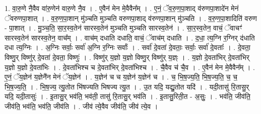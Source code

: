 \documentclass[17pt]{extarticle}
\begin{document}
1. वा॒रु॒णे नै॒वैव वा॑रु॒णेन॑ वारु॒णे नै॒व । . ए॒वैन॑ मेन मे॒वैवैन᳚म् । . ए॒नं॒ ॅव॒रु॒ण॒पा॒शाद् व॑रुणपा॒शादे॑न मेनं ॅवरुणपा॒शात् । . व॒रु॒ण॒पा॒शान् मु॑ञ्चति मुञ्चति वरुणपा॒शाद् व॑रुणपा॒शान् मु॑ञ्चति । . व॒रु॒ण॒पा॒शादिति॑ वरुण - पा॒शात् । . मु॒ञ्च॒ति॒ सा॒र॒स्व॒तेन॑ सारस्व॒तेन॑ मुञ्चति मुञ्चति सारस्व॒तेन॑ । . सा॒र॒स्व॒तेन॒ वाचं॒ ॅवाचꣳ॑ सारस्व॒तेन॑ सारस्व॒तेन॒ वाच᳚म् । . वाच॑म् दधाति दधाति॒ वाचं॒ ॅवाच॑म् दधाति । . द॒धा॒ त्य॒ग्नि र॒ग्निर् द॑धाति दधा त्य॒ग्निः । . अ॒ग्निः सर्वाः॒ सर्वा॑ अ॒ग्नि र॒ग्निः सर्वाः᳚ । . सर्वा॑ दे॒वता॑ दे॒वताः॒ सर्वाः॒ सर्वा॑ दे॒वताः᳚ । . दे॒वता॒ विष्णु॒र् विष्णु॑र् दे॒वता॑ दे॒वता॒ विष्णुः॑ । . विष्णु॑र् य॒ज्ञो य॒ज्ञो विष्णु॒र् विष्णु॑र् य॒ज्ञ्ः । . य॒ज्ञो दे॒वता॑भिर् दे॒वता॑भिर् य॒ज्ञो य॒ज्ञो दे॒वता॑भिः । . दे॒वता॑भिश्च च दे॒वता॑भिर् दे॒वता॑भिश्च । . चै॒वैव च॑ चै॒व । . ए॒वैन॑ मेन मे॒वैवैन᳚म् । . ए॒नं॒ ॅय॒ज्ञेन॑ य॒ज्ञेनै॑न मेनं ॅय॒ज्ञेन॑ । . य॒ज्ञेन॑ च च य॒ज्ञेन॑ य॒ज्ञेन॑ च । . च॒ भि॒ष॒ज्य॒ति॒ भि॒ष॒ज्य॒ति॒ च॒ च॒ भि॒ष॒ज्य॒ति॒ । . भि॒ष॒ज्य॒ त्यु॒तोत भि॑षज्यति भिषज्य त्यु॒त । . उ॒त यदि॒ यद्यु॒तोत यदि॑ । . यदी॒तासु॑ रि॒तासु॒र् यदि॒ यदी॒तासुः॑ । . इ॒तासु॒र् भव॑ति॒ भव॑ती॒ तासु॑ रि॒तासु॒र् भव॑ति । . इ॒तासु॒रिती॒त - अ॒सुः॒ । . भव॑ति॒ जीव॑ति॒ जीव॑ति॒ भव॑ति॒ भव॑ति॒ जीव॑ति । . जीव॑ त्ये॒वैव जीव॑ति॒ जीव॑ त्ये॒व । \newline
\end{document}
